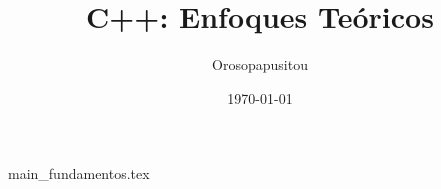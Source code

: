 \documentclass[12pt,a4paper,twoside]{book}
\title{C++: Enfoques Teóricos}
\author{Orosopapusitou}
\date{\today}
\begin{document}
\frontmatter

\mainmatter

{main_fundamentos.tex}

\backmatter



\end{document}
